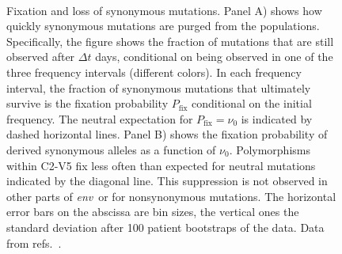 \documentclass[rmp, twocolumn]{revtex4}
\newcommand{\pfix}{P_{\mathrm{fix}}}
\newcommand{\env}{\textit{env}}
\newcommand{\shankaregion}{C2-V5}
\begin{document}
\begin{figure}
\begin{center}
\\
\caption{Fixation and loss of synonymous mutations.
Panel A) shows how quickly synonymous mutations are purged from the populations. 
Specifically, the figure shows the fraction of mutations that are still observed
after $\Delta t$ days, conditional on being observed in one of the three frequency 
intervals (different colors). 
In each frequency interval, the fraction of synonymous
mutations that ultimately survive is the fixation probability $\pfix$ conditional on the
initial frequency. The neutral expectation for $\pfix=\nu_0$ is indicated by 
dashed horizontal lines.
Panel B) shows the fixation probability of derived synonymous
alleles as a function of $\nu_0$. Polymorphisms within \shankaregion{} fix less
often than expected for neutral mutations indicated by the diagonal line.
This suppression is not observed in other parts of \env~or for nonsynonymous mutations.
The horizontal error bars on the abscissa are bin sizes, the vertical ones the
standard deviation after 100 patient bootstraps of the data. Data from
refs.~\cite{shankarappa_consistent_1999,liu_selection_2006, bunnik_autologous_2008}.}
\label{fig:fixp}
\end{center}
\end{figure}
\end{document}
